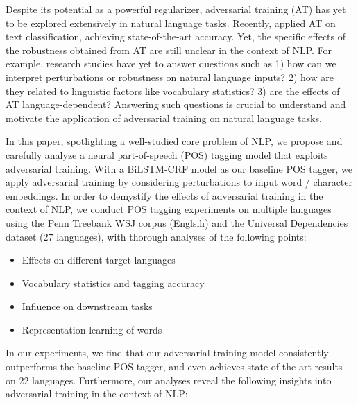 \documentclass[11pt,a4paper]{article}
\begin{document}
Despite its potential as a powerful regularizer, adversarial training (AT) has yet to be explored extensively in natural language tasks.
Recently,  applied AT on text classification,
achieving state-of-the-art accuracy.
Yet, the specific effects of the robustness obtained from AT are still unclear in the context of NLP.
For example,
research studies have yet to answer questions such as
1) how can we interpret perturbations or robustness on natural language inputs?
2) how are they related to linguistic factors like vocabulary statistics?
3) are the effects of AT language-dependent?
Answering such questions is crucial to understand and motivate the application of adversarial training on natural language tasks. 


In this paper,
spotlighting a well-studied core problem of NLP, we propose and carefully analyze a neural part-of-speech (POS) tagging model that exploits adversarial training.
With a BiLSTM-CRF model \cite{Huang2015BidirectionalLM,ma-hovy:2016:P16-1} as our baseline POS tagger, we
apply adversarial training by considering perturbations to input word \!/\! character embeddings.
In order to demystify the effects of adversarial training in the context of NLP, we conduct POS tagging experiments on multiple languages using the Penn Treebank WSJ corpus (Englsih) and the Universal Dependencies dataset (27 languages), with thorough analyses of the following points: \vspace{0mm}
\begin{itemize}[topsep=2mm]
\setlength{\parskip}{-1.4mm}
\setlength{\leftskip}{-0mm}
    \item Effects on different target languages
    \item Vocabulary statistics and tagging accuracy
    \item Influence on downstream tasks
    \item Representation learning of words\vspace{-1mm}
\end{itemize}

In our experiments, we find that our adversarial training model consistently
outperforms the baseline POS tagger, and even achieves state-of-the-art results on 22 languages.
Furthermore,
our analyses reveal the following 
insights into adversarial training in the context of NLP: \vspace{-1mm}
\end{document}

